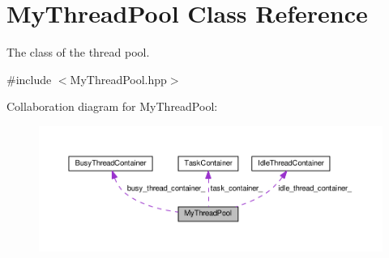 \hypertarget{classMyThreadPool}{}\section{My\+Thread\+Pool Class Reference}
\label{classMyThreadPool}


The class of the thread pool.  




{\ttfamily \#include $<$My\+Thread\+Pool.\+hpp$>$}



Collaboration diagram for My\+Thread\+Pool\+:\nopagebreak
\begin{figure}[H]
\begin{center}
\leavevmode
\includegraphics[width=350pt]{classMyThreadPool__coll__graph}
\end{center}
\end{figure}
